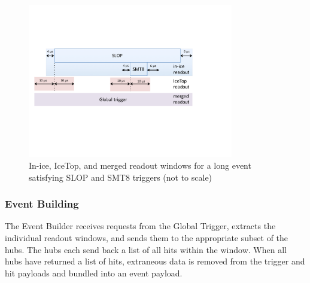 \begin{figure}[!h]
 \centering
 \includegraphics[width=0.8\textwidth]{graphics/online/trigger/trigger_readout}
 \caption{In-ice, IceTop, and merged readout windows for a long event satisfying SLOP and SMT8 triggers (not to scale)}
 \label{fig:trigger_readout}
\end{figure}


\subsubsection{\label{sect:online:evbuilder}Event Building}

The Event Builder receives requests from the Global Trigger, extracts
the individual readout windows, and sends them to the appropriate subset of the
hubs.  The hubs each send back a list of all hits within the window.  When all
hubs have returned a list of hits, extraneous data is removed from the trigger
and hit payloads and bundled into an event payload.

